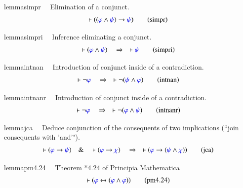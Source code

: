\begin{restatable}{lemma}{simpr}~~ Elimination of a conjunct. 
\begin{align}
\vdash ( ( \mw{\varphi} \wedge \mw{\psi} ) \rightarrow \mw{\psi}
    )\label{eq:simpr}\tag{simpr}
\end{align}
\end{restatable}

\begin{restatable}{lemma}{simpri}~~ Inference eliminating a conjunct. 
\begin{align}
\vdash ( \mw{\varphi} \wedge \mw{\psi} )\quad\Rightarrow\quad \vdash
    \mw{\psi}\label{eq:simpri}\tag{simpri}
\end{align}
\end{restatable}

\begin{restatable}{lemma}{intnan}~~ Introduction of conjunct inside of a
contradiction.  
\begin{align}
\vdash \lnot \mw{\varphi}\quad\Rightarrow\quad \vdash \lnot ( \mw{\psi} \wedge
    \mw{\varphi} )\label{eq:intnan}\tag{intnan}
\end{align}
\end{restatable}

\begin{restatable}{lemma}{intnanr}~~ Introduction of conjunct inside of a
contradiction.  
\begin{align}
\vdash \lnot \mw{\varphi}\quad\Rightarrow\quad \vdash \lnot ( \mw{\varphi}
    \wedge \mw{\psi} )\label{eq:intnanr}\tag{intnanr}
\end{align}
\end{restatable}

\begin{restatable}{lemma}{jca}~~ Deduce conjunction of the consequents of two
implications (``join
       consequents with 'and'").  
\begin{align}
\vdash ( \mw{\varphi} \rightarrow \mw{\psi} )\quad\&\quad \vdash ( \mw{\varphi}
    \rightarrow \mw{\chi} )\quad\Rightarrow\quad \vdash ( \mw{\varphi}
    \rightarrow ( \mw{\psi} \wedge \mw{\chi} ) )\label{eq:jca}\tag{jca}
\end{align}
\end{restatable}

\begin{restatable}{lemma}{pm4.24}~~ Theorem *4.24 of Principia Mathematica
\begin{align}
\vdash ( \mw{\varphi} \leftrightarrow ( \mw{\varphi} \wedge \mw{\varphi} )
    )\label{eq:pm4.24}\tag{pm4.24}
\end{align}
\end{restatable}

